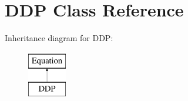 \hypertarget{class_open_chams_1_1_d_d_p}{\section{D\-D\-P Class Reference}
\label{class_open_chams_1_1_d_d_p}
}
Inheritance diagram for D\-D\-P\-:\begin{figure}[H]
\begin{center}
\leavevmode
\includegraphics[height=2.000000cm]{class_open_chams_1_1_d_d_p}
\end{center}
\end{figure}
